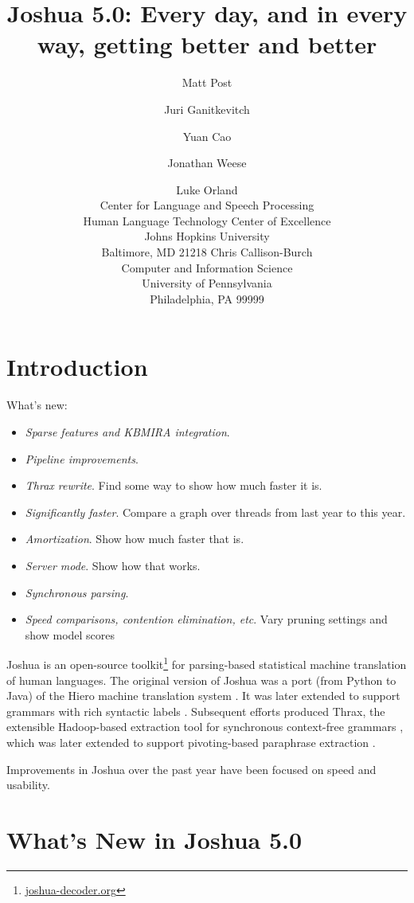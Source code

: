 \documentclass[11pt]{article}
\title{Joshua 5.0: Every day, and in every way, getting better and better}
\author{Matt Post\hltcoe \and Juri Ganitkevitch\clsp \and Yuan Cao\clsp \and Jonathan Weese\clsp 
  \and Luke Orland\hltcoe \\
  \clsp Center for Language and Speech Processing \\
  \hltcoe Human Language Technology Center of Excellence \\
  Johns Hopkins University \\
  Baltimore, MD 21218
  \AND  Chris Callison-Burch \\
  Computer and Information Science \\
  University of Pennsylvania \\
  Philadelphia, PA 99999
}
\date{}
\begin{document}
\maketitle

\begin{abstract}

\end{abstract}

\section{Introduction}
\label{sec-intro}

What's new:

\begin{itemize}
  \item \emph{Sparse features and KBMIRA integration}.
  \item \emph{Pipeline improvements}.
  \item \emph{Thrax rewrite}. Find some way to show how much faster it is.
  \item \emph{Significantly faster}. Compare a graph over threads from last year to this year.
  \item \emph{Amortization}. Show how much faster that is.
  \item \emph{Server mode}. Show how that works.
  \item \emph{Synchronous parsing}. 
  \item \emph{Speed comparisons, contention elimination, etc}. Vary pruning settings and show model
    scores 
\end{itemize}

Joshua is an open-source toolkit\footnote{\url{joshua-decoder.org}}
for parsing-based statistical machine translation of human
languages. The original version of Joshua \cite{Joshua-WMT} was a port
(from Python to Java) of the Hiero machine translation system
\cite{Chiang2007}. It was later extended to support grammars with rich
syntactic labels \cite{li2010joshua}. Subsequent efforts produced
Thrax, the extensible Hadoop-based extraction tool for
synchronous context-free grammars \cite{Joshua-3.0}, which was later
extended to support pivoting-based paraphrase extraction
\cite{Joshua-4.0}.

Improvements in Joshua over the past year have been focused on speed
and usability.

\section{What's New in Joshua 5.0}
\end{document}
